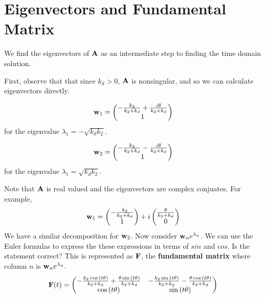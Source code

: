 \documentclass[11pt]{article}
\begin{document}
\section{Eigenvectors and Fundamental Matrix}

We find the eigenvectors of \({\bf A}\) as an intermediate step to
finding the time domain solution.

First, observe that that since \(k_d > 0\), \({\bf A}\) is nonsingular,
and so we can calculate eigenvectors directly.

\begin{equation}
    {\bf w}_1 =
    \begin{pmatrix}
- \frac{k_{2}}{k_{2} + k_{d}}
+ \frac{i \theta}{k_{2} + k_{d}} 
\\ 1
\end{pmatrix}
\end{equation}
for the eigenvalue $\lambda_1 = - \sqrt{k_d k_2}$.

\begin{equation}
    {\bf w}_2 =
    \begin{pmatrix}
- \frac{k_{2}}{k_{2} + k_{d}}
- \frac{i \theta}{k_{2} + k_{d}} 
\\ 1
\end{pmatrix}
\end{equation}
for the eigenvalue $\lambda_1 = \sqrt{k_d k_2}$.


Note that ${\bf A}$ is real valued and the eigenvectors are complex
conjuates. For example,
\begin{equation}
{\bf w}_ 1 = 
\begin{pmatrix}
- \frac{k_{2}}{k_{2} + k_{d}}
\\ 1
\end{pmatrix}
+
i
\begin{pmatrix}
 \frac{\theta}{k_{2} + k_{d}} 
\\ 0
\end{pmatrix}
\end{equation}
We have a similar decomposition for ${\bf w}_2$.
Now consider ${\bf w}_n e^{\lambda_n}$.
We can use the Euler formulas to express the these expressions
in terms of $sin$ and $cos$.
{\color{red} Is the statement correct?}
This is represented as ${\bf F}$, the {\bf fundamental matrix} where column $n$ is
${\bf w}_n e^{\lambda_n}$.
\begin{equation}
{\bf F} (t) = \begin{pmatrix}- \frac{k_{2} \cos{\left(t \theta \right)}}{k_{2} + k_{d}} 
+ \frac{\theta \sin{\left(t \theta \right)}}{k_{2} + k_{d}} & - \frac{k_{2} \sin{\left(t \theta \right)}}{k_{2} + k_{d}} - \frac{\theta \cos{\left(t \theta \right)}}{k_{2} + k_{d}}\\\cos{\left(t \theta \right)} & \sin{\left(t \theta \right)}
\end{pmatrix}
\end{equation}
\end{document}
